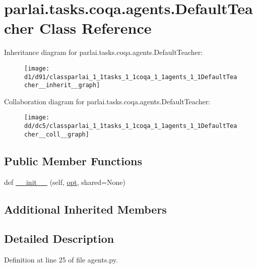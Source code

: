 \hypertarget{classparlai_1_1tasks_1_1coqa_1_1agents_1_1DefaultTeacher}{}\section{parlai.\+tasks.\+coqa.\+agents.\+Default\+Teacher Class Reference}
\label{classparlai_1_1tasks_1_1coqa_1_1agents_1_1DefaultTeacher}


Inheritance diagram for parlai.\+tasks.\+coqa.\+agents.\+Default\+Teacher\+:
\nopagebreak
\begin{figure}[H]
\begin{center}
\leavevmode
\texttt{[image: d1/d91/classparlai\_1\_1tasks\_1\_1coqa\_1\_1agents\_1\_1DefaultTeacher\_\_inherit\_\_graph]}
\end{center}
\end{figure}


Collaboration diagram for parlai.\+tasks.\+coqa.\+agents.\+Default\+Teacher\+:
\nopagebreak
\begin{figure}[H]
\begin{center}
\leavevmode
\texttt{[image: dd/dc5/classparlai\_1\_1tasks\_1\_1coqa\_1\_1agents\_1\_1DefaultTeacher\_\_coll\_\_graph]}
\end{center}
\end{figure}
\subsection*{Public Member Functions}
\begin{DoxyCompactItemize}
\item 
def \hyperlink{classparlai_1_1tasks_1_1coqa_1_1agents_1_1DefaultTeacher_a62b634fe9152617c94604f39ff7851a1}{\+\_\+\+\_\+init\+\_\+\+\_\+} (self, \hyperlink{classparlai_1_1core_1_1agents_1_1Teacher_a3ce6243860ce978a897922863ed32fa4}{opt}, shared=None)
\end{DoxyCompactItemize}
\subsection*{Additional Inherited Members}


\subsection{Detailed Description}


Definition at line 25 of file agents.\+py.



